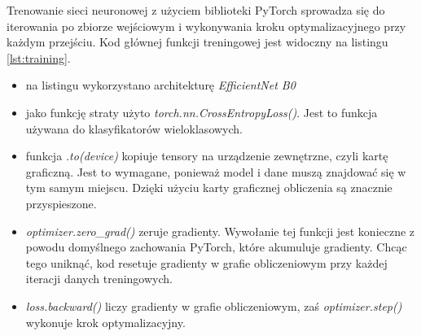 Trenowanie sieci neuronowej z użyciem biblioteki PyTorch sprowadza się do iterowania po zbiorze wejściowym i wykonywania kroku optymalizacyjnego przy każdym przejściu.
Kod głównej funkcji treningowej jest widoczny na listingu \ref{lst:training}.

\begin{itemize}
    \item na listingu wykorzystano architekturę \textit{EfficientNet B0}
    \item jako funkcję straty użyto \textit{torch.nn.CrossEntropyLoss()}.
    Jest to funkcja używana do klasyfikatorów wieloklasowych.
    \item funkcja \textit{.to(device)} kopiuje tensory na urządzenie zewnętrzne, czyli kartę graficzną.
    Jest to wymagane, ponieważ model i dane muszą znajdować się w tym samym miejscu.
    Dzięki użyciu karty graficznej obliczenia są znacznie przyspieszone.
    \item \textit{optimizer.zero\_grad()} zeruje gradienty.
    Wywołanie tej funkcji jest konieczne z powodu domyślnego zachowania PyTorch, które akumuluje gradienty.
    Chcąc tego uniknąć, kod resetuje gradienty w grafie obliczeniowym przy każdej iteracji danych treningowych.
    \item \textit{loss.backward()} liczy gradienty w grafie obliczeniowym, zaś \textit{optimizer.step()} wykonuje krok optymalizacyjny.
\end{itemize}



